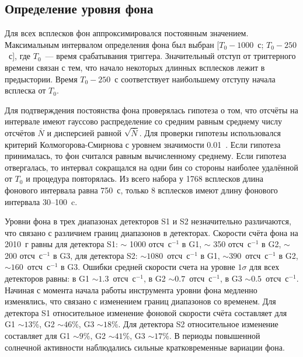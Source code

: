 \subsection{Определение уровня фона}
Для всех всплесков фон аппроксимировался постоянным значением. Максимальным 
интервалом определения фона был выбран [$T_0 - 1000$~с; $T_0 - 250$~с], 
где $T_0$~--- время срабатывания триггера. Значительный отступ от триггерного 
времени связан с тем, что начало некоторых длинных всплесков лежит в предыстории. 
Время $T_0-250$~с соответствует наибольшему отступу начала всплеска от $T_0$.

Для подтверждения постоянства фона проверялась гипотеза о том, что отсчёты на 
интервале имеют гауссово распределение со средним равным среднему числу отсчётов 
$\overline{N}$ и дисперсией равной $\sqrt{\overline{N}}$. Для проверки гипотезы 
использовался критерий Колмогорова-Смирнова с уровнем значимости 0.01~\citep{Press1992NRC}. 
Если гипотеза принималась, то фон считался равным вычисленному среднему. 
Если гипотеза отвергалась, то интервал сокращался на одни бин со стороны наиболее 
удалённой от $T_0$ и процедура повторялась. Из всего набора у 1768 всплесков длина 
фонового интервала равна 750~с, только 8 всплесков имеют длину фонового интервала 30--100~c.

Уровни фона в трех диапазонах детекторов S1 и S2 незначительно различаются, что 
связано с различием границ диапазонов в детекторах. Скорости счёта фона на 2010~г 
равны для детектора S1: $\sim$ 1000 отсч~с$^{-1}$ в G1, $\sim$ 350 отсч~с$^{-1}$ в G2, 
$\sim$ 200 отсч~с$^{-1}$ в G3, для детектора S2: $\sim 1080$~отсч~с$^{-1}$ в G1, 
$\sim 390$~отсч~с$^{-1}$ в G2, $\sim160$~отсч~с$^{-1}$ в G3. Ошибки средней 
скорости счета на уровне $1\sigma$ для всех детекторов равны: в G1 
$\sim 1.3$~отсч~с$^{-1}$, в G2 $\sim 0.7$~отсч~с$^{-1}$, в G3 $\sim 0.5$~отсч~с$^{-1}$. 
Начиная с момента начала работы инструмента уровни фона медленно изменялись, 
что связано с изменением границ диапазонов со временем. Для детектора S1 относительное 
изменение фоновой скорости счёта составляет для G1 $\sim 13$\%, G2 $\sim 46$\%, 
G3 $\sim 18$\%. Для детектора S2 относительное изменение составляет для G1 $\sim 9$\%, 
G2 $\sim 41$\%, G3 $\sim 17$\%. В периоды повышенной солнечной активности наблюдались 
сильные кратковременные вариации фона. 

